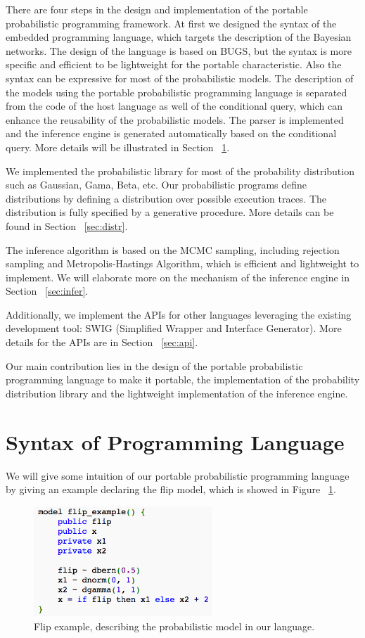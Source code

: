There are four steps in the design and implementation of the portable probabilistic programming framework. At first we designed the syntax of the embedded programming language, which targets the description of the Bayesian networks. The design of the language is based on BUGS, but the syntax is more specific and efficient to be lightweight for the portable characteristic. Also the syntax can be expressive for most of the probabilistic models. The description of the models using the portable probabilistic programming language is separated from the code of the host language as well of the conditional query, which can enhance the reusability of the probabilistic models. The parser is implemented and the inference engine is generated automatically based on the conditional query. More details will be illustrated in Section ~\ref{sec:syntax}. 

We implemented the probabilistic library for most of the probability distribution such as Gaussian, Gama, Beta, etc. Our probabilistic programs define distributions by defining a distribution over possible execution traces. The distribution is fully specified by a generative procedure. More details can be found in Section ~\ref{sec:distr}. 

The inference algorithm is based on the MCMC sampling, including rejection sampling and Metropolis-Hastings Algorithm, which is efficient and lightweight to implement. We will elaborate more on the mechanism of the inference engine in Section ~\ref{sec:infer}. 

Additionally, we implement the APIs for other languages leveraging the existing development tool: SWIG (Simplified Wrapper and Interface Generator). More details for the APIs are in Section ~\ref{sec:api}.

Our main contribution lies in the design of the portable probabilistic programming language to make it portable, the implementation of the probability distribution library and the lightweight implementation of the inference engine.


\section{Syntax of Programming Language}
\label{sec:syntax}
We will give some intuition of our portable probabilistic programming language by giving an example declaring the flip model, which is showed in Figure ~\ref{fig:flip_eg}. 

\begin{figure}
    \centering
    \includegraphics[width=0.6\textwidth]{figures/flip_eg.png}
    \caption{Flip example, describing the probabilistic model in our language.}
    \label{fig:flip_eg}
\end{figure}

